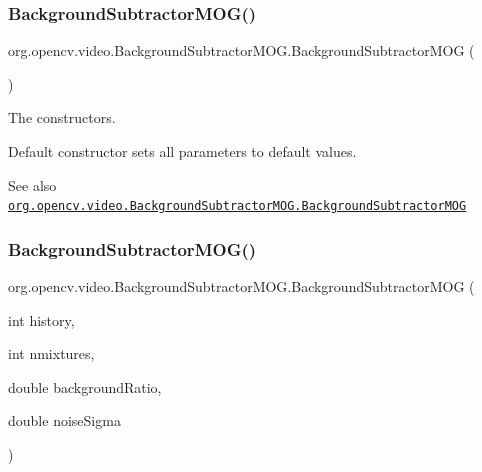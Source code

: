 \mbox{\label{classorg_1_1opencv_1_1video_1_1_background_subtractor_m_o_g_a967a71fd61add07e4aa5959d6e5937d2}} 
\subsubsection{\texorpdfstring{Background\+Subtractor\+M\+O\+G()}{BackgroundSubtractorMOG()}\hspace{0.1cm}{\footnotesize\ttfamily [2/4]}}
{\footnotesize\ttfamily org.\+opencv.\+video.\+Background\+Subtractor\+M\+O\+G.\+Background\+Subtractor\+M\+OG (\begin{DoxyParamCaption}{ }\end{DoxyParamCaption})}

The constructors.

Default constructor sets all parameters to default values.

\begin{DoxySeeAlso}{See also}
\href{http://docs.opencv.org/modules/video/doc/motion_analysis_and_object_tracking.html#backgroundsubtractormog-backgroundsubtractormog}{\tt org.\+opencv.\+video.\+Background\+Subtractor\+M\+O\+G.\+Background\+Subtractor\+M\+OG} 
\end{DoxySeeAlso}
\mbox{\label{classorg_1_1opencv_1_1video_1_1_background_subtractor_m_o_g_a3bb67fa2656fed103b86c5bd8a5e6274}} 
\subsubsection{\texorpdfstring{Background\+Subtractor\+M\+O\+G()}{BackgroundSubtractorMOG()}\hspace{0.1cm}{\footnotesize\ttfamily [3/4]}}
{\footnotesize\ttfamily org.\+opencv.\+video.\+Background\+Subtractor\+M\+O\+G.\+Background\+Subtractor\+M\+OG (\begin{DoxyParamCaption}\item[{int}]{history,  }\item[{int}]{nmixtures,  }\item[{double}]{background\+Ratio,  }\item[{double}]{noise\+Sigma }\end{DoxyParamCaption})}

